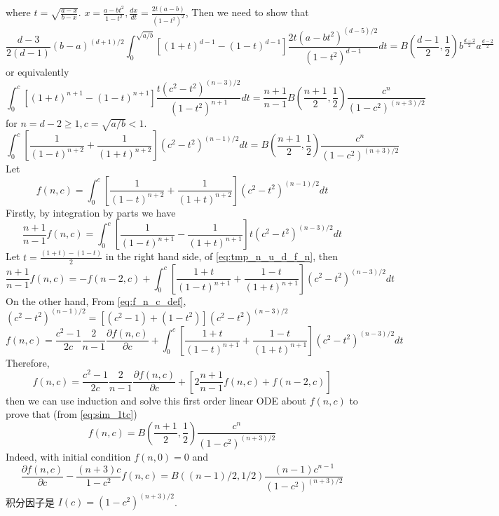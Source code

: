 \documentclass{article}
\begin{document}
where $t=\sqrt{\frac{a-x}{b-x}}$.
$x=\frac{a-bt^2}{1-t^2},\frac{dx}{dt} = \frac{2t(a-b)}{(1-t^2)^2}$,
Then we need to show that
\begin{equation*}
\frac{d-3}{2(d-1)} (b-a)^{(d+1)/2}\int_0^{\sqrt{a/b}} [(1+t)^{d-1}-(1-t)^{d-1}] \frac{2t(a-bt^2)^{(d-5)/2}}{(1-t^2)^{d-1}}dt
= B(\frac{d-1}{2}, \frac{1}{2})
b^{\frac{d-2}{2}}
a^{\frac{d-2}{2}}
\end{equation*}
or equivalently
\begin{equation*}
    \int_0^{c}
    [(1+t)^{n+1}-(1-t)^{n+1}]
    \frac{t(c^2- t^2)^{(n-3)/2}}{(1-t^2)^{n+1}}dt
    = \frac{n+1}{n-1}B(\frac{n+1}{2}, \frac{1}{2})
    \frac{c^n}{(1-c^2)^{(n+3)/2}}
    \end{equation*}
for $n=d-2\geq 1, c=\sqrt{a/b}<1$.    
\begin{equation}
    \int_0^{c}
    [\frac{1}{(1-t)^{n+2}}+\frac{1}{(1+t)^{n+2}}]
    (c^2- t^2)^{(n-1)/2}dt
    =B(\frac{n+1}{2}, \frac{1}{2})
    \frac{c^n}{(1-c^2)^{(n+3)/2}}
    \end{equation}
Let
\begin{equation}\label{eq:f_n_c_def}
 f(n,c)=   \int_0^{c}
    [\frac{1}{(1-t)^{n+2}}+\frac{1}{(1+t)^{n+2}}]
    (c^2- t^2)^{(n-1)/2}dt
\end{equation}
Firstly, by integration by parts 
we have 
\begin{equation}\label{eq:tmp_n_u_d_f_n}
    \frac{n+1}{n-1}f(n,c)
    =\int_0^{c}
    \left[\frac{1}{(1-t)^{n+1}}
    -\frac{1}{(1+t)^{n+1}}
    \right]
    t(c^2- t^2)^{(n-3)/2}
    dt
\end{equation}
Let $t=\frac{(1+t)-(1-t)}{2}$ in the right hand side,
of \eqref{eq:tmp_n_u_d_f_n}, then
\begin{equation}
    \frac{n+1}{n-1}f(n,c)
=    -f(n-2,c)  
+ \int_0^{c}
\left[\frac{1+t}{(1-t)^{n+1}}
+\frac{1-t}{(1+t)^{n+1}}
\right]
(c^2- t^2)^{(n-3)/2}
dt
\end{equation}
On the other hand,
From \eqref{eq:f_n_c_def},
$(c^2-t^2)^{(n-1)/2}
=[(c^2-1)+(1-t^2)](c^2-t^2)^{(n-3)/2}$
\begin{equation}
    f(n, c) = \frac{c^2-1}{2c}\frac{2}{n-1}\frac{\partial f(n,c)}{\partial c}
    +  \int_0^{c}
    \left[\frac{1+t}{(1-t)^{n+1}}
    +\frac{1-t}{(1+t)^{n+1}}
    \right]
    (c^2- t^2)^{(n-3)/2}
    dt
\end{equation}
Therefore,
\begin{equation}\label{eq:sim_1tc}
    f(n,c)=\frac{c^2-1}{2c}\frac{2}{n-1}\frac{\partial f(n,c)}{\partial c}
    + [2\frac{n+1}{n-1} f(n,c) + f(n-2, c)]
\end{equation}
then we can use induction and solve this
first order linear ODE about $f(n,c)$ to prove
that (from \eqref{eq:sim_1tc})
\begin{equation}
    f(n,c)= B(\frac{n+1}{2}, \frac{1}{2})
    \frac{c^n}{(1-c^2)^{(n+3)/2}}
\end{equation}
Indeed, with initial condition $f(n,0)=0$ and
\begin{equation}
    \frac{\partial f(n,c)}{\partial c}
    - \frac{(n+3)c}{1-c^2} f(n,c)
    = B((n-1)/2, 1/2)\frac{(n-1)c^{n-1}}{(1-c^2)^{(n+3)/2}}
\end{equation}
积分因子是 $I(c)=(1-c^2)^{(n+3)/2}$.
\end{document}

